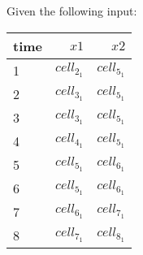 
Given the following input:
\begin{table}[ht!]
\begin{center}
\begin{tabular}{|l|r|r|}
\hline
time & $\mathit{x}1$& $\mathit{x}2$\\
\hline
1 & $\mathit{cell}_2_1$& $\mathit{cell}_5_1$ \\
2 & $\mathit{cell}_3_1$& $\mathit{cell}_5_1$ \\
3 & $\mathit{cell}_3_1$& $\mathit{cell}_5_1$ \\
4 & $\mathit{cell}_4_1$& $\mathit{cell}_5_1$ \\
5 & $\mathit{cell}_5_1$& $\mathit{cell}_6_1$ \\
6 & $\mathit{cell}_5_1$& $\mathit{cell}_6_1$ \\
7 & $\mathit{cell}_6_1$& $\mathit{cell}_7_1$ \\
8 & $\mathit{cell}_7_1$& $\mathit{cell}_8_1$ \\
\hline
\end{tabular}
\end{center}
\end{table}

